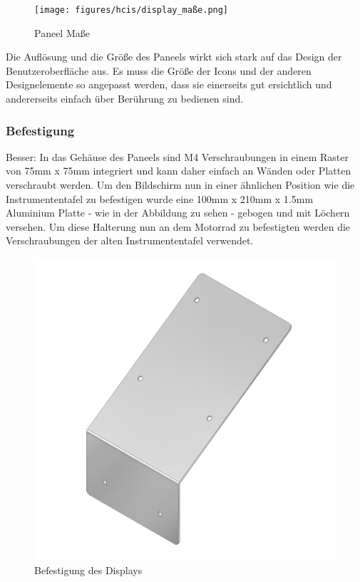 \begin{figure}[H]
	\begin{center}
		\texttt{[image: figures/hcis/display\_maße.png]}
		\caption{Paneel Maße}
		\label{fig:panel}
	\end{center}
\end{figure}

Die Auflösung und die Größe des Paneels wirkt sich stark auf das Design der Benutzeroberfläche aus. Es muss die Größe der Icons und der anderen Designelemente so angepasst werden, dass sie einerseits gut ersichtlich und andererseits einfach über Berührung zu bedienen sind.\\

\newpage

\subsubsection{Befestigung}
Besser: In das Gehäuse des Paneels sind M4 Verschraubungen in einem Raster von 75mm x 75mm integriert und kann daher einfach an Wänden oder Platten verschraubt werden. Um den Bildschirm nun in einer ähnlichen Position wie die Instrumententafel zu befestigen wurde eine 100mm x 210mm x 1.5mm Aluminium Platte - wie in der Abbildung zu sehen - gebogen und mit Löchern versehen. Um diese Halterung nun an dem Motorrad zu befestigten werden die Verschraubungen der alten Instrumententafel verwendet.

\begin{figure}[H]
	\begin{center}
		\includegraphics[scale=0.18]{figures/hcis/befestigung_display.png}
		\caption{Befestigung des Displays}
		\label{fig:befestigung}
	\end{center}
\end{figure}

